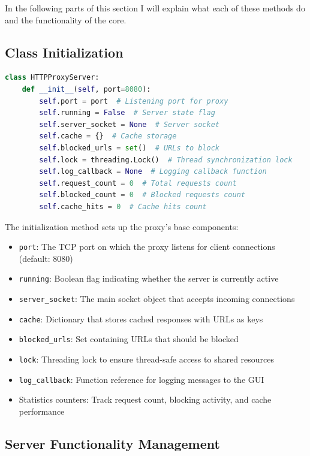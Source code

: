 \documentclass[a4paper]{article}
\begin{document}
	In the following parts of this section I will explain what each of these methods do and the functionality of the core.
	
	\pagebreak
	
	\subsection{Class Initialization}
	\vspace{0.5cm}
	\begin{lstlisting}[language=Python, caption=HTTPProxyServer Class Initialization]
class HTTPProxyServer:
	def __init__(self, port=8080):
		self.port = port  # Listening port for proxy
		self.running = False  # Server state flag
		self.server_socket = None  # Server socket
		self.cache = {}  # Cache storage
		self.blocked_urls = set()  # URLs to block
		self.lock = threading.Lock()  # Thread synchronization lock
		self.log_callback = None  # Logging callback function
		self.request_count = 0  # Total requests count
		self.blocked_count = 0  # Blocked requests count
		self.cache_hits = 0  # Cache hits count
	\end{lstlisting}
	
	The initialization method sets up the proxy's base components:
	
	\begin{itemize}
		\item \texttt{port}: The TCP port on which the proxy listens for client connections (default: 8080)
		\item \texttt{running}: Boolean flag indicating whether the server is currently active
		\item \texttt{server\_socket}: The main socket object that accepts incoming connections
		\item \texttt{cache}: Dictionary that stores cached responses with URLs as keys
		\item \texttt{blocked\_urls}: Set containing URLs that should be blocked
		\item \texttt{lock}: Threading lock to ensure thread-safe access to shared resources
		\item \texttt{log\_callback}: Function reference for logging messages to the GUI
		\item Statistics counters: Track request count, blocking activity, and cache performance
	\end{itemize}
	
	\subsection{Server Functionality Management}
	
\end{document}
